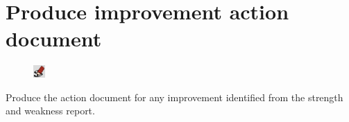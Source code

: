 \documentclass[11pt,oneside]{book}
\begin{document}
\section{Produce improvement action document}
\begin{shadebox}
\begin{figure}
\vspace{-15pt}\hspace{-10pt}
    \includegraphics[width=0.04\textwidth]{note-icon}
\end{figure}
Produce the action document for any improvement identified from the strength and weakness report.
\end{shadebox}

\end{document}
